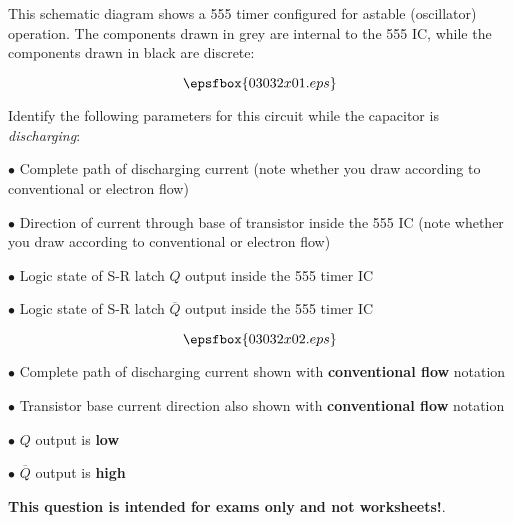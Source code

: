 

This schematic diagram shows a 555 timer configured for astable (oscillator) operation.  The components drawn in grey are internal to the 555 IC, while the components drawn in black are discrete:

$$\epsfbox{03032x01.eps}$$

Identify the following parameters for this circuit while the capacitor is {\it discharging}:

\medskip
\item{$\bullet$} Complete path of discharging current (note whether you draw according to conventional or electron flow)
\item{$\bullet$} Direction of current through base of transistor inside the 555 IC (note whether you draw according to conventional or electron flow)
\item{$\bullet$} Logic state of S-R latch $Q$ output inside the 555 timer IC
\item{$\bullet$} Logic state of S-R latch $\overline{Q}$ output inside the 555 timer IC
\medskip







$$\epsfbox{03032x02.eps}$$

\medskip
\item{$\bullet$} Complete path of discharging current shown with {\bf conventional flow} notation
\item{$\bullet$} Transistor base current direction also shown with {\bf conventional flow} notation
\item{$\bullet$} $Q$ output is {\bf low}
\item{$\bullet$} $\overline{Q}$ output is {\bf high}
\medskip







{\bf This question is intended for exams only and not worksheets!}.




